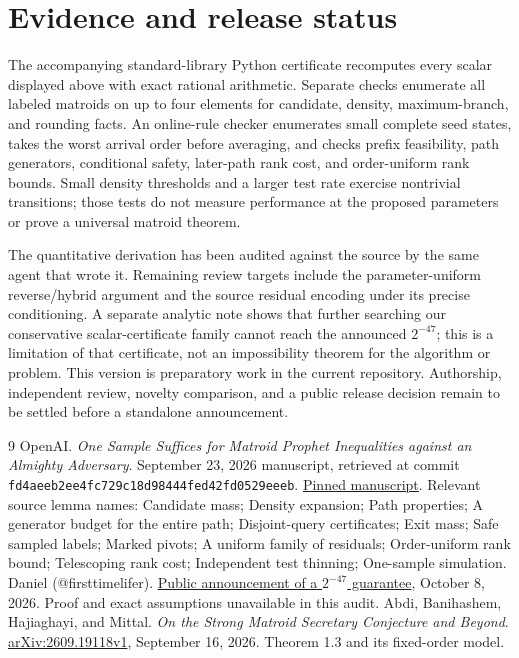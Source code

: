 \documentclass[11pt]{article}
\begin{document}
\section{Evidence and release status}

The accompanying standard-library Python certificate recomputes every
scalar displayed above with exact rational arithmetic. Separate checks
enumerate all labeled matroids on up to four elements for candidate,
density, maximum-branch, and rounding facts. An online-rule checker
enumerates small complete seed states, takes the worst arrival order
before averaging, and checks prefix feasibility, path generators,
conditional safety, later-path rank cost, and order-uniform rank bounds.
Small density thresholds and a larger test rate exercise nontrivial
transitions; those tests do not measure performance at the proposed
parameters or prove a universal matroid theorem.

The quantitative derivation has been audited against the source by
the same agent that wrote it. Remaining review targets include the
parameter-uniform reverse/hybrid argument and the source residual
encoding under its precise conditioning. A separate analytic note shows
that further searching our conservative scalar-certificate family
cannot reach the announced $2^{-47}$; this is a limitation of that
certificate, not an impossibility theorem for the algorithm or problem.
This version is preparatory work in the current repository. Authorship,
independent review, novelty comparison, and a public release decision
remain to be settled before a standalone announcement.

\begin{thebibliography}{9}
 OpenAI.
\emph{One Sample Suffices for Matroid Prophet Inequalities against an
Almighty Adversary}. September 23, 2026 manuscript, retrieved at
commit \texttt{fd4aeeb2ee4fc729c18d98444fed42fd0529eeeb}.
\href{https://github.com/openai/math/blob/fd4aeeb2ee4fc729c18d98444fed42fd0529eeeb/preprints/One-Sample-Suffices-for-Matroid-Prophet-Inequalities-against-an-Almighty-Adversary-September-23-2026/final.pdf}{Pinned manuscript}.
Relevant source lemma names: Candidate mass; Density expansion; Path
properties; A generator budget for the entire path; Disjoint-query
certificates; Exit mass; Safe sampled labels; Marked pivots; A uniform
family of residuals; Order-uniform rank bound; Telescoping rank cost;
Independent test thinning; One-sample simulation.
 Daniel (@firsttimelifer).
\href{https://x.com/firsttimelifer/status/2108282829809541468}{Public
announcement of a $2^{-47}$ guarantee}, October 8, 2026.
Proof and exact assumptions unavailable in this audit.
 Abdi, Banihashem, Hajiaghayi, and Mittal.
\emph{On the Strong Matroid Secretary Conjecture and Beyond}.
\href{https://arxiv.org/abs/2609.19118v1}{arXiv:2609.19118v1},
September 16, 2026. Theorem 1.3 and its fixed-order model.
\end{thebibliography}
\end{document}
